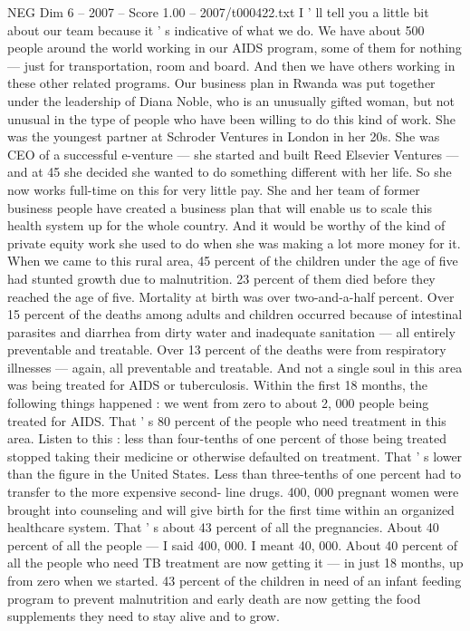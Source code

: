 \begin{textsample}{NEG Dim 6 – 2007 – Score 1.00 – 2007/t000422.txt}
I ' ll tell you a little bit about our team because it ' s indicative of what we do.
We have about 500 people around the world working in our AIDS program, some of them for nothing — just for transportation, room and board.
And then we have others working in these other related programs.
Our business plan in Rwanda was put together under the leadership of Diana Noble, who is an unusually gifted woman, but not unusual in the type of people who have been willing to do this kind of work.
She was the youngest partner at Schroder Ventures in London in her 20s.
She was CEO of a successful e-venture — she started and built Reed Elsevier Ventures — and at 45 she decided she wanted to do something different with her life.
So she now works full-time on this for very little pay.
She and her team of former business people have created a business plan that will enable us to scale this health system up for the whole country.
And it would be worthy of the kind of private equity work she used to do when she was making a lot more money for it.
When we came to this rural area, 45 percent of the children under the age of five had stunted growth due to malnutrition. 23 percent of them died before they reached the age of five.
Mortality at birth was over two-and-a-half percent.
Over 15 percent of the deaths among adults and children occurred because of intestinal parasites and diarrhea from dirty water and inadequate sanitation — all entirely preventable and treatable.
Over 13 percent of the deaths were from respiratory illnesses — again, all preventable and treatable.
And not a single soul in this area was being treated for AIDS or tuberculosis.
Within the first 18 months, the following things happened : we went from zero to about 2, 000 people being treated for AIDS.
That ' s 80 percent of the people who need treatment in this area.
Listen to this : less than four-tenths of one percent of those being treated stopped taking their medicine or otherwise defaulted on treatment.
That ' s lower than the figure in the United States.
Less than three-tenths of one percent had to transfer to the more expensive second- line drugs. 400, 000 pregnant women were brought into counseling and will give birth for the first time within an organized healthcare system.
That ' s about 43 percent of all the pregnancies.
About 40 percent of all the people — I said 400, 000.
I meant 40, 000.
About 40 percent of all the people who need TB treatment are now getting it — in just 18 months, up from zero when we started. 43 percent of the children in need of an infant feeding program to prevent malnutrition and early death are now getting the food supplements they need to stay alive and to grow.

\end{textsample}
